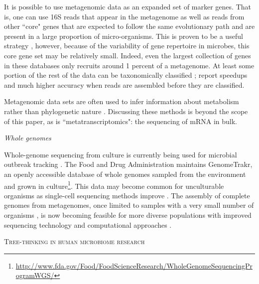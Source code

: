 \documentclass{amsart}
\renewcommand{\section}[1]{%
\bigskip
\begin{center}
\begin{Large}
\normalfont\scshape #1
\medskip
\end{Large}
\end{center}}
\renewcommand{\subsection}[1]{%
\bigskip
\begin{center}
\begin{large}
\normalfont\itshape #1
\end{large}
\end{center}}
\begin{document}
It is possible to use metagenomic data as an expanded set of marker genes.
That is, one can use 16S reads that appear in the metagenome as well as reads from other ``core" genes that are expected to follow the same evolutionary path and are present in a large proportion of micro-organisms.
This is proven to be a useful strategy \citep{von2007quantitative,wu2008amphora,stark2010mltreemap,kembel2011phylogenetic}, however, because of the variability of gene repertoire in microbes, this core gene set may be relatively small.
Indeed, even the largest collection of genes in these databases only recruits around 1 percent of a metagenome.
At least some portion of the rest of the data can be taxonomically classified \citep[methods reviewed by][]{mande2012classification}; \citet{treangen2013metamos} report speedups and much higher accuracy when reads are assembled before they are classified.

Metagenomic data sets are often used to infer information about metabolism rather than phylogenetic nature \citep{greenblum2012metagenomic,abubucker2012metabolic}.
Discussing these methods is beyond the scope of this paper, as is ``metatranscriptomics": the sequencing of mRNA in bulk.


\subsection{Whole genomes}
Whole-genome sequencing from culture is currently being used for microbial outbreak tracking \citep{koser2012rapid,snitkin2012tracking}.
The Food and Drug Administration maintains GenomeTrakr, an openly accessible database of whole genomes sampled from the environment and grown in culture\footnote{\url{http://www.fda.gov/Food/FoodScienceResearch/WholeGenomeSequencingProgramWGS/}}.
This data may become common for unculturable organisms as single-cell sequencing methods improve \citep[reviewed in][]{kalisky2011single}.
The assembly of complete genomes from metagenomes, once limited to samples with a very small number of organisms \citep{baker2010enigmatic}, is now becoming feasible for more diverse populations with improved sequencing technology and computational approaches \citep{howe2012assembling,pell2012scaling,iverson2012untangling,emerson2012metagenomic,podell2013assembly}.


\section{Tree-thinking in human microbiome research}
\end{document}
